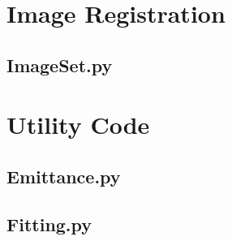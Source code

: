 \section{Image Registration}
\subsection{ImageSet.py}


\section{Utility Code}

\subsection{Emittance.py}


\subsection{Fitting.py}
